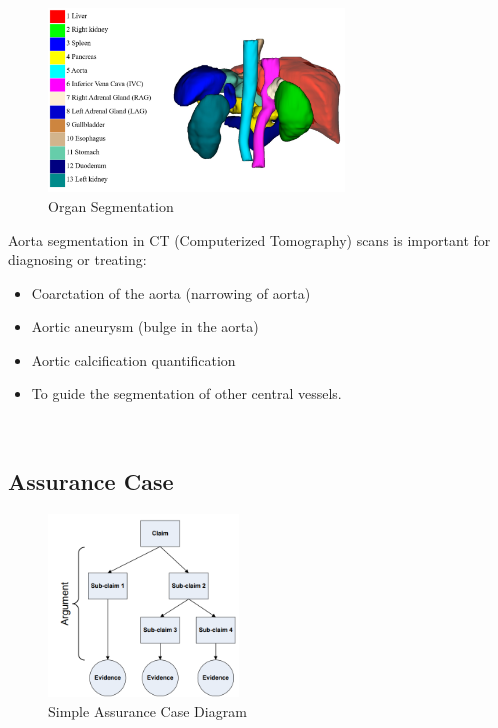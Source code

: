 \begin{figure}[ht]
    \centering
    \includegraphics[width=0.7\textwidth]{figures/Intro/segmentation.png}
    \caption[Organ Segmentation]{Organ Segmentation \cite{Ma-2021-AbdomenCT-1K}}
    \label{fig_seg}
\end{figure}

Aorta segmentation in CT (Computerized Tomography) scans is important for diagnosing or treating:
\begin{itemize}
\item Coarctation of the aorta (narrowing of aorta)
\item Aortic aneurysm (bulge in the aorta)
\item Aortic calcification quantification
\item To guide the segmentation of other central vessels. 
\end{itemize} ~

\subsection{Assurance Case}\label{ac}
\begin{figure}[ht]
    \centering
    \includegraphics[width=0.45\textwidth]{figures/Intro/ac_diagram.png}
    \caption[Simple Assurance Case Diagram]{Simple Assurance Case Diagram \cite{doi:10.2514/6.2009-1921}}
    \label{fig_ac_diagram}
\end{figure}


